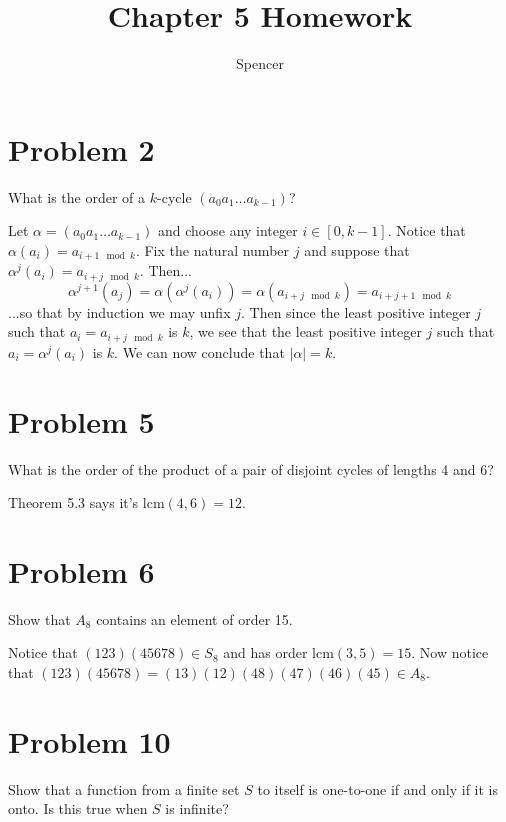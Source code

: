 \documentclass{article}
\title{Chapter 5 Homework}
\author{Spencer}
\begin{document}
\maketitle

\newcommand{\lcm}{\mbox{lcm}}
\newcommand{\stab}{\mbox{stab}}

\section*{Problem 2}

What is the order of a $k$-cycle $(a_0a_1\dots a_{k-1})$?

Let $\alpha=(a_0a_1\dots a_{k-1})$ and choose any integer $i\in[0,k-1]$.
Notice that $\alpha(a_i)=a_{i+1\mod k}$.  Fix the natural number $j$
and suppose that $\alpha^j(a_i)=a_{i+j\mod k}$.  Then...
\begin{equation*}
\alpha^{j+1}(a_j) = \alpha(\alpha^j(a_i)) = \alpha(a_{i+j\mod k}) = a_{i+j+1\mod k}
\end{equation*}
...so that by induction we may unfix $j$.  Then since the least positive integer $j$
such that $a_i=a_{i+j\mod k}$ is $k$, we see that the least positive integer $j$
such that $a_i=\alpha^j(a_i)$ is $k$.  We can now conclude that $|\alpha|=k$.

\section*{Problem 5}

What is the order of the product of a pair of disjoint cycles of lengths 4
and 6?

Theorem 5.3 says it's $\lcm(4,6)=12$.

\section*{Problem 6}

Show that $A_8$ contains an element of order 15.

Notice that $(123)(45678)\in S_8$ and has order $\lcm(3,5)=15$.
Now notice that $(123)(45678)=(13)(12)(48)(47)(46)(45)\in A_8$.

\section*{Problem 10}

Show that a function from a finite set $S$ to itself is one-to-one if and only if
it is onto.  Is this true when $S$ is infinite?
\end{document}
